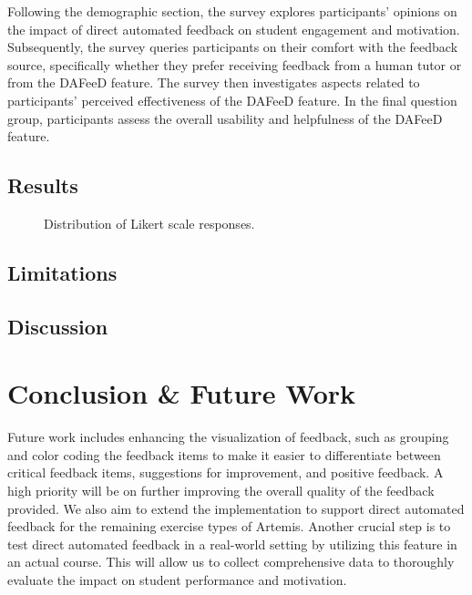 \documentclass[manuscript,screen,review]{acmart}
\begin{document}
Following the demographic section, the survey explores participants' opinions on the impact of direct automated feedback on student engagement and motivation.
Subsequently, the survey queries participants on their comfort with the feedback source, specifically whether they prefer receiving feedback from a human tutor or from the DAFeeD feature.
The survey then investigates aspects related to participants' perceived effectiveness of the DAFeeD feature.
In the final question group, participants assess the overall usability and helpfulness of the DAFeeD feature.


\subsection{Results}

\begin{figure}[htpb]
  \centering
  \resizebox{0.8\textwidth}{!}{
    
  }
  \caption[Distribution of Likert scale responses]{Distribution of Likert scale responses.}
\end{figure}


\subsection{Limitations}

\subsection{Discussion}


\section{Conclusion \& Future Work} %
\label{sec:conclusion}

% 
Future work includes enhancing the visualization of feedback, such as grouping and color coding the feedback items to make it easier to differentiate between critical feedback items, suggestions for improvement, and positive feedback.
A high priority will be on further improving the overall quality of the feedback provided. 
We also aim to extend the implementation to support direct automated feedback for the remaining exercise types of Artemis.
Another crucial step is to test direct automated feedback in a real-world setting by utilizing this feature in an actual course. 
This will allow us to collect comprehensive data to thoroughly evaluate the impact on student performance and motivation.



\end{document}
